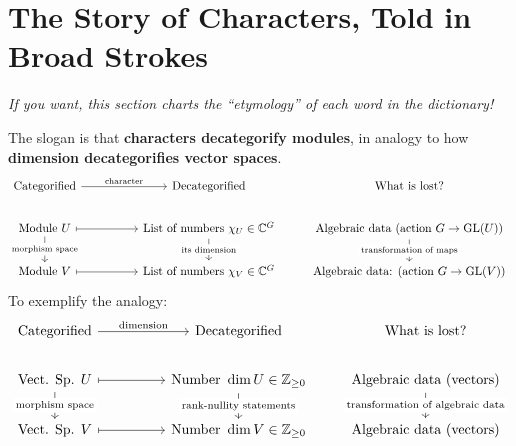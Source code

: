 \section{The Story of Characters, Told in Broad Strokes} \label{sec:broad-strokes} %
\pan\textit{If you want, this section charts the ``etymology'' of each word in the dictionary!}
\par The slogan is that \textbf{characters decategorify modules}, in analogy to how \textbf{dimension decategorifies vector spaces}.
\begin{align*}
  \begin{tikzcd}[ampersand replacement = \;]
      \text{Categorified}
        \arrow[rr, "\text{character}"]
      \;
      \; \text{Decategorified}
      \; \text{What is lost?}
    \\
      \text{Module } U
        \arrow[d, "\text{morphism space}" description]
        \arrow[rr, mapsto]
      \;
      \; \text{List of numbers } \chi_U \in \mathbb{C}^G
        \arrow[d, "\text{its dimension}" description]
      \; \text{Algebraic data (action } {G \to \GL(U)})
        \arrow[d, "\text{transformation of maps}" description]
    \\
      \text{Module } V
        \arrow[rr, mapsto]
      \;
      \; \text{List of numbers } \chi_V \in \mathbb{C}^G
      \; \text{Algebraic data: (action } {G \to \GL(V)})
  \end{tikzcd}
\end{align*}
\pan To exemplify the analogy:
\begin{align*}
  \begin{tikzcd}[ampersand replacement = \;]
      \text{Categorified}
        \arrow[rr, "\text{dimension}"]
      \;
      \; \text{Decategorified}
      \; \text{What is lost?}
    \\
      \text{Vect. Sp. } U
        \arrow[d, "\text{morphism space}" description]
        \arrow[rr, mapsto]
      \;
      \; \text{Number } \dim U \in \mathbb{Z}_{\geq 0}
        \arrow[d, "\text{rank-nullity statements}" description]
      \; \text{Algebraic data (vectors)}
        \arrow[d, "\text{transformation of algebraic data}" description]
    \\
      \text{Vect. Sp. } V
        \arrow[rr, mapsto]
      \;
      \; \text{Number } \dim V \in \mathbb{Z}_{\geq 0}
      \; \text{Algebraic data (vectors)}
  \end{tikzcd}
\end{align*}
